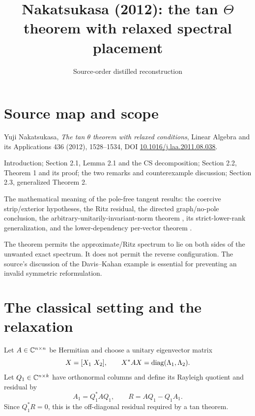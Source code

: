
\title{Nakatsukasa (2012): the tan $\Theta$ theorem with relaxed spectral placement}
\author{}
\date{Source-order distilled reconstruction}

\maketitle

\section*{Source map and scope}
\begin{sourceguide}
\item[Primary source] Yuji Nakatsukasa, \emph{The tan $\theta$ theorem with relaxed conditions}, Linear Algebra and its Applications 436 (2012), 1528--1534, DOI \href{https://doi.org/10.1016/j.laa.2011.08.038}{10.1016/j.laa.2011.08.038}.
\item[Coverage] Introduction; Section 2.1, Lemma 2.1 and the CS decomposition; Section 2.2, Theorem 1 and its proof; the two remarks and counterexample discussion; Section 2.3, generalized Theorem 2.
\item[Formalization target] The mathematical meaning of the pole-free tangent results: the coercive strip/exterior hypotheses, the Ritz residual, the directed graph/no-pole conclusion, the arbitrary-unitarily-invariant-norm theorem , its strict-lower-rank generalization, and the lower-dependency per-vector theorem .
\item[Orientation warning] The theorem permits the approximate/Ritz spectrum to lie on both sides of the unwanted exact spectrum. It does not permit the reverse configuration. The source's discussion of the Davis--Kahan example is essential for preventing an invalid symmetric reformulation.
\end{sourceguide}

\section{The classical setting and the relaxation}

Let $A\in\mathbb{C}^{n\times n}$ be Hermitian and choose a unitary eigenvector matrix
\[
  X=[X_1\ X_2],
  \qquad
  X^*AX=\operatorname{diag}(\Lambda_1,\Lambda_2).
\]
Let $Q_1\in\mathbb{C}^{n\times k}$ have orthonormal columns and define its Rayleigh quotient and residual by
\[
  A_1=Q_1^*AQ_1,
  \qquad
  R=AQ_1-Q_1A_1.
\]
Since $Q_1^*R=0$, this is the off-diagonal residual required by a tan theorem.

